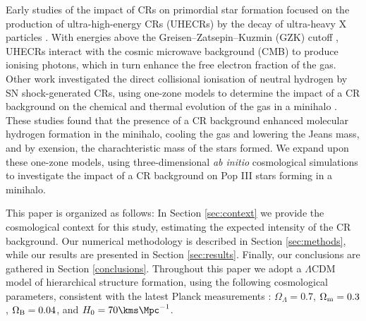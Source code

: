 Early studies of the impact of CRs on primordial star formation focused on the production of ultra-high-energy CRs (UHECRs) by the decay of ultra-heavy X particles \citep{ShchekinovVasiliev2004,VasilievShchekinov2006,RipamontiMapelliFerrara2007}.  With energies above the Greisen--Zatsepin--Kuzmin (GZK) cutoff \citep{Greisen1966,ZatsepinKuzmin1966}, UHECRs interact with the cosmic microwave background (CMB) to produce ionising photons, which in turn enhance the free electron fraction of the gas.  
Other work investigated the direct collisional ionisation of neutral hydrogen by SN shock-generated CRs, using one-zone models to determine the impact of a CR background on the chemical and thermal evolution of the gas in a minihalo \citep{StacyBromm2007,JascheCiardiEnsslin2007}.  These studies found that the presence of a CR background enhanced molecular hydrogen formation in the minihalo, cooling the gas and lowering the Jeans mass, and by exension, the charachteristic mass of the stars formed. We expand upon these one-zone models, using three-dimensional \textit{ab initio} cosmological simulations to investigate the impact of a CR background on Pop III stars forming in a minihalo.

This paper is organized as follows: In Section \ref{sec:context} we provide the cosmological context for this study, estimating the expected intensity of the CR background. Our numerical methodology is described in Section \ref{sec:methods}, while our results are presented in Section \ref{sec:results}.  Finally, our conclusions are gathered in Section \ref{conclusions}. Throughout this paper we adopt a $\Lambda$CDM model of hierarchical structure formation, using the following cosmological parameters, consistent with the latest Planck measurements \citep{PlanckParams2015}: $\Omega_{\Lambda} = 0.7$, $\Omega_{\rm m} = 0.3$, $\Omega_{\rm B} = 0.04$, and $H_0 = 70 \kms \Mpc^{-1}$.